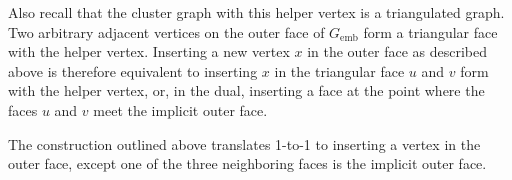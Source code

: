 Also recall that the cluster graph with this helper vertex is a triangulated graph.
Two arbitrary adjacent vertices on the outer face of $G_\text{emb}$ form a triangular face with the helper vertex.
Inserting a new vertex $x$ in the outer face as described above is therefore equivalent to inserting $x$ in the triangular face $u$ and $v$ form with the helper vertex, or, in the dual, inserting a face at the point where the faces $u$ and $v$ meet the implicit outer face.

The construction outlined above translates 1-to-1 to inserting a vertex in the outer face, except one of the three neighboring faces is the implicit outer face.
